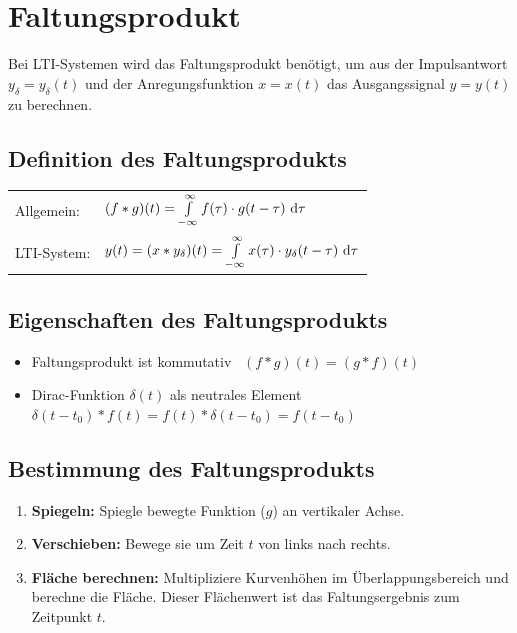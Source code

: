 \section{Faltungsprodukt}

Bei LTI-Systemen wird das Faltungsprodukt benötigt, um aus der Impulsantwort  $y_{\delta} = y_{\delta}(t)$ und der Anregungsfunktion 
$x = x(t)$ das Ausgangssignal $y = y(t)$ zu berechnen.


\subsection{Definition des Faltungsprodukts}

\renewcommand{\arraystretch}{2}
\begin{tabular}{ll}
    Allgemein:  & $ (f * g)(t) = \int\limits_{-\infty}^{\infty} f(\tau) \cdot g(t - \tau) \, \mathop{} \! \mathrm{d} \tau$                            \\
    LTI-System: & $y(t) = (x * y_{\delta} )(t) = \int \limits_{-\infty}^{\infty} x(\tau) \cdot y_{\delta}(t - \tau) \, \mathop{} \! \mathrm{d} \tau $ 
\end{tabular}
\renewcommand{\arraystretch}{1}


\subsection{Eigenschaften des Faltungsprodukts} 

\begin{itemize}
    \item Faltungsprodukt ist kommutativ \textrightarrow\ $(f * g)(t) = (g * f)(t)$
    \item Dirac-Funktion $\delta(t)$ als neutrales Element \\   
        $\delta(t - t_0) * f(t) = f(t) * \delta(t - t_0) = f(t - t_0)$
\end{itemize}


\subsection{Bestimmung des Faltungsprodukts}

\begin{enumerate}
    \item \textbf{Spiegeln:} Spiegle bewegte Funktion ($g$) an vertikaler Achse.
    \item \textbf{Verschieben:} Bewege sie um Zeit $t$ von links nach rechts.
    \item \textbf{Fläche berechnen:} Multipliziere Kurvenhöhen im Überlappungsbereich und berechne die Fläche. Dieser Flächenwert ist das Faltungsergebnis zum Zeitpunkt $t$.
\end{enumerate}


